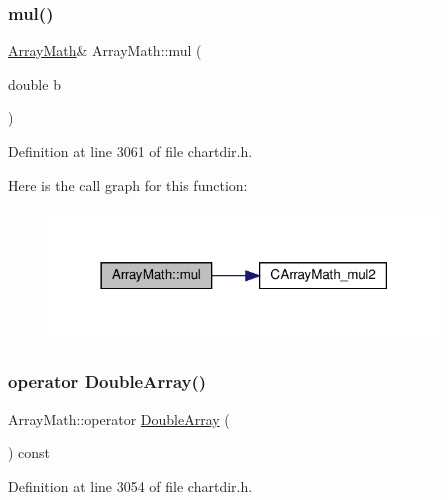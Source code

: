 \subsubsection{\texorpdfstring{mul()}{mul()}\hspace{0.1cm}{\footnotesize\ttfamily [2/2]}}
{\footnotesize\ttfamily \hyperlink{class_array_math}{Array\+Math}\& Array\+Math\+::mul (\begin{DoxyParamCaption}\item[{double}]{b }\end{DoxyParamCaption})\hspace{0.3cm}{\ttfamily [inline]}}



Definition at line 3061 of file chartdir.\+h.

Here is the call graph for this function\+:
\nopagebreak
\begin{figure}[H]
\begin{center}
\leavevmode
\includegraphics[width=294pt]{class_array_math_ad44c0c320ef2f9401be5e54d51dc6c73_cgraph}
\end{center}
\end{figure}
\mbox{\label{class_array_math_a1b309d87396b6971a40a71ea333b628d}} 
\subsubsection{\texorpdfstring{operator Double\+Array()}{operator DoubleArray()}}
{\footnotesize\ttfamily Array\+Math\+::operator \hyperlink{class_double_array}{Double\+Array} (\begin{DoxyParamCaption}{ }\end{DoxyParamCaption}) const\hspace{0.3cm}{\ttfamily [inline]}}



Definition at line 3054 of file chartdir.\+h.

\mbox{\label{class_array_math_aefa81728a4b712db88e3e4453bf384ad}} 
